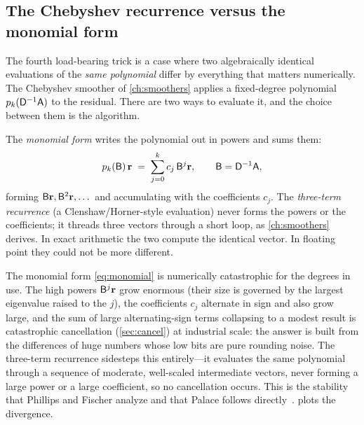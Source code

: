 \subsection{The Chebyshev recurrence versus the monomial form}
\label{sec:cheby}

The fourth load-bearing trick is a case where two algebraically identical
evaluations of the \emph{same polynomial} differ by everything that matters
numerically. The Chebyshev smoother of \cref{ch:smoothers} applies a fixed-degree
polynomial $p_k(\mathsf{D}^{-1}\mathsf{A})$ to the residual. There are two ways to
evaluate it, and the choice between them is the algorithm.

The \emph{monomial form} writes the polynomial out in powers and sums them:
\begin{equation}
\label{eq:monomial}
  p_k(\mathsf{B})\,\mathbf{r} \;=\; \sum_{j=0}^{k} c_j\,\mathsf{B}^{j}\mathbf{r},
  \qquad \mathsf{B} = \mathsf{D}^{-1}\mathsf{A},
\end{equation}
forming $\mathsf{B}\mathbf{r}, \mathsf{B}^2\mathbf{r}, \dots$ and accumulating with the coefficients
$c_j$. The \emph{three-term recurrence} (a Clenshaw/Horner-style evaluation) never
forms the powers or the coefficients; it threads three vectors through a short loop,
as \cref{ch:smoothers} derives. In exact arithmetic the two compute the identical
vector. In floating point they could not be more different.

The monomial form \eqref{eq:monomial} is numerically catastrophic for the degrees in
use. The high powers $\mathsf{B}^{j}\mathbf{r}$ grow enormous (their size is governed by the
largest eigenvalue raised to the $j$), the coefficients $c_j$ alternate in sign and
also grow large, and the sum of large alternating-sign terms collapsing to a modest
result is catastrophic cancellation (\cref{sec:cancel}) at industrial scale: the
answer is built from the differences of huge numbers whose low bits are pure
rounding noise. The three-term recurrence sidesteps this entirely---it evaluates the
same polynomial through a sequence of moderate, well-scaled intermediate vectors,
never forming a large power or a large coefficient, so no cancellation occurs. This
is the stability that Phillips and Fischer analyze and that Palace follows
directly~\citep[\S2]{phillipsfischer2022}.  plots the divergence.

